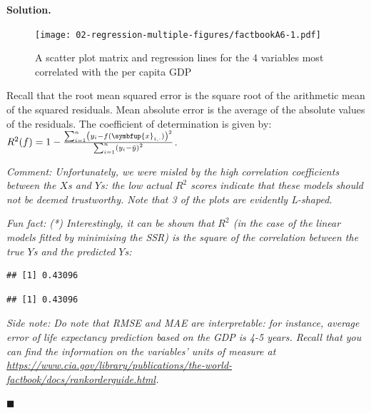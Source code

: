 \documentclass[10pt,b5paper,krantz1]{krantz}
\newenvironment{Shaded}{\begin{snugshade}}{\end{snugshade}}
\newcommand{\DataTypeTok}[1]{\textcolor[rgb]{0.27,0.27,0.27}{#1}}
\newcommand{\DecValTok}[1]{\textcolor[rgb]{0.06,0.06,0.06}{#1}}
\newcommand{\KeywordTok}[1]{\textcolor[rgb]{0.27,0.27,0.27}{\textbf{#1}}}
\newcommand{\NormalTok}[1]{#1}
\newcommand{\OperatorTok}[1]{\textcolor[rgb]{0.43,0.43,0.43}{\textbf{#1}}}
\newcommand{\OtherTok}[1]{\textcolor[rgb]{0.37,0.37,0.37}{#1}}
\newcommand{\StringTok}[1]{\textcolor[rgb]{0.5,0.5,0.5}{#1}}
\newenvironment{solution}{%
\bigskip\noindent\textbf{Solution. }%
\it\ignorespaces%
\ignorespaces%
}{\ignorespaces%
\hfill$\blacksquare$%
}
\renewcommand{\mathbf}[1]{\symbfup{#1}}
\begin{document}
\begin{solution}
\begin{figure}
\hypertarget{fig:factbookA6}{%
\centering
\texttt{[image: 02-regression-multiple-figures/factbookA6-1.pdf]}
\caption{A scatter plot matrix and regression lines for the 4 variables most correlated with the per capita GDP}\label{fig:factbookA6}
}
\end{figure}

Recall that the root mean squared error is the square root of
the arithmetic mean of the squared residuals.
Mean absolute error is the average of the absolute values of the residuals.
The coefficient of determination
is given by: \(R^2(f) = 1 - \frac{\sum_{i=1}^{n} \left(y_i-f(\mathbf{x}_{i,\cdot})\right)^2}{\sum_{i=1}^{n} \left(y_i-\bar{y}\right)^2}\).

\emph{Comment: Unfortunately, we were misled by the high correlation coefficients
between the \(X\)s and \(Y\)s:
the low actual \(R^2\) scores indicate that these models should not
be deemed trustworthy. Note that 3 of the plots are evidently L-shaped.}

\emph{Fun fact: (*) Interestingly, it can be shown that \(R^2\)
(in the case of the linear models fitted by minimising
the SSR) is the square of the correlation
between the true \(Y\)s and the predicted \(Y\)s:}

\begin{Shaded}
\end{Shaded}

\begin{verbatim}
## [1] 0.43096
\end{verbatim}

\begin{Shaded}
\end{Shaded}

\begin{verbatim}
## [1] 0.43096
\end{verbatim}

\emph{Side note: Do note that RMSE and MAE are interpretable: for instance,
average error of life expectancy prediction based on the GDP is
4-5 years. Recall that you can find the information on the variables' units
of measure at
\url{https://www.cia.gov/library/publications/the-world-factbook/docs/rankorderguide.html}.}

\end{solution}
\end{document}
